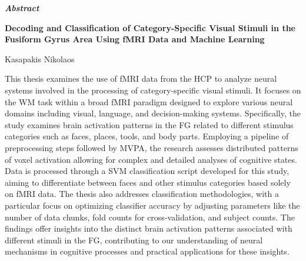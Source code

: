 \thispagestyle{plain}
\vspace*{\fill}
\begin{center}
    \LARGE
    \textit{\textbf{Abstract}}
        
    \vspace{0.4cm}
    \large
    \textbf{Decoding and Classification of Category-Specific Visual Stimuli in the Fusiform Gyrus Area Using fMRI Data and Machine Learning}
        
    \vspace{0.4cm}
    Kasapakis Nikolaos
\end{center}
\normalsize

\vspace{0.9cm}

This thesis examines the use of \gls{fMRI} data from the \gls{HCP} to analyze neural systems involved in the processing of category-specific visual stimuli. It focuses on the \gls{WM} task within a broad \gls{fMRI} paradigm designed to explore various neural domains including visual, language, and decision-making systems. Specifically, the study examines brain activation patterns in the \gls{FG} related to different stimulus categories such as faces, places, tools, and body parts. Employing a pipeline of preprocessing steps followed by \gls{MVPA}, the research assesses distributed patterns of voxel activation allowing for complex and detailed analyses of cognitive states. Data is processed through a \gls{SVM} classification script developed for this study, aiming to differentiate between faces and other stimulus categories based solely on \gls{fMRI} data. The thesis also addresses classification methodologies, with a particular focus on optimizing classifier accuracy by adjusting parameters like the number of data chunks, fold counts for cross-validation, and subject counts. The findings offer insights into the distinct brain activation patterns associated with different stimuli in the \gls{FG}, contributing to our understanding of neural mechanisms in cognitive processes and practical applications for these insights.

\vspace*{\fill}

